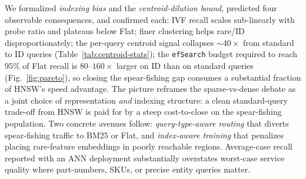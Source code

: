 \documentclass[conference]{IEEEtran}
\begin{document}
We formalized \emph{indexing bias} and the \emph{centroid-dilution bound}, predicted four observable consequences, and confirmed each: IVF recall scales sub-linearly with probe ratio and plateaus below Flat; finer clustering helps rare/ID disproportionately; the per-query centroid signal collapses $\sim\!40\times$ from standard to ID queries (Table~\ref{tab:centroid-stats}); the \texttt{efSearch} budget required to reach $95\%$ of Flat recall is $80$--$160\times$ larger on ID than on standard queries (Fig.~\ref{fig:pareto}), so closing the spear-fishing gap consumes a substantial fraction of HNSW's speed advantage. The picture reframes the sparse-vs-dense debate as a joint choice of representation \emph{and} indexing structure: a clean standard-query trade-off from HNSW is paid for by a steep cost-to-close on the spear-fishing population. Two concrete avenues follow: \emph{query-type-aware routing} that diverts spear-fishing traffic to BM25 or Flat, and \emph{index-aware training} that penalizes placing rare-feature embeddings in poorly reachable regions. Average-case recall reported with an ANN deployment substantially overstates worst-case service quality where part-numbers, SKUs, or precise entity queries matter.

\end{document}
